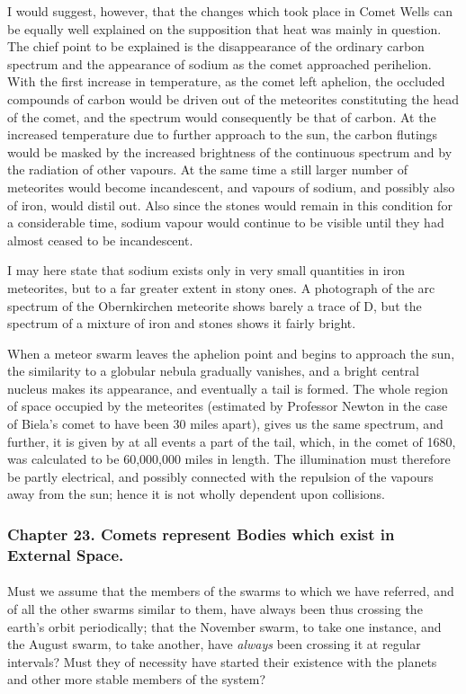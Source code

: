 \documentclass[a4paper, 12pt, oneside, polutonikogreek, english]{article}
\begin{document}
I would suggest, however, that the changes which took place in Comet Wells can be equally well explained on the supposition that heat was mainly in question. The chief point to be explained is the disappearance of the ordinary carbon spectrum and the appearance of sodium as the comet approached perihelion. With the first increase in temperature, as the comet left aphelion, the occluded compounds of carbon would be driven out of the meteorites constituting the head of the comet, and the spectrum would consequently be that of carbon. At the increased temperature due to further approach to the sun, the carbon flutings would be masked by the increased brightness of the continuous spectrum and by the radiation of other vapours. At the same time a still larger number of meteorites would become incandescent, and vapours of sodium, and possibly also of iron, would distil out. Also since the stones would remain in this condition for a considerable time, sodium vapour would continue to be visible until they had almost ceased to be incandescent.

I may here state that sodium exists only in very small quantities in iron meteorites, but to a far greater extent in stony ones. A photograph of the arc spectrum of the Obernkirchen meteorite shows barely a trace of D, but the spectrum of a mixture of iron and stones shows it fairly bright.

When a meteor swarm leaves the aphelion point and begins to approach the sun, the similarity to a globular nebula gradually vanishes, and a bright central nucleus makes its appearance, and eventually a tail is formed. The whole region of space occupied by the meteorites (estimated by Professor Newton in the case of Biela's comet to have been 30 miles apart), gives us the same spectrum, and further, it is given by at all events a part of the tail, which, in the comet of 1680, was calculated to be 60,000,000 miles in length. The illumination must therefore be partly electrical, and possibly connected with the repulsion of the vapours away from the sun; hence it is not wholly dependent upon collisions.
\clearpage
\subsubsection{Chapter 23. Comets represent Bodies which exist in External Space.}
\paragraph{}
Must we assume that the members of the swarms to which we have referred, and of all the other swarms similar to them, have always been thus crossing the earth's orbit periodically; that the November swarm, to take one instance, and the August swarm, to take another, have \emph{always} been crossing it at regular intervals? Must they of necessity have started their existence with the planets and other more stable members of the system?
\end{document}
